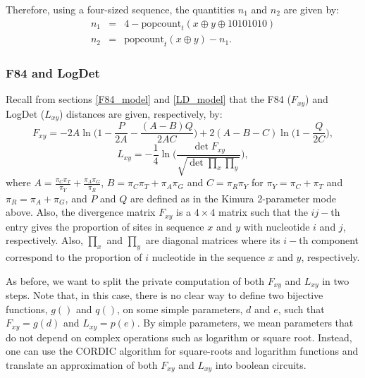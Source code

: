 Therefore, using a four-sized sequence, the quantities $n_1$ and $n_2$ are given by:
\begin{eqnarray*}
n_1 &=& 4 - \text{popcount}_t(x\oplus y\oplus 10101010)\\
n_2 &=& \text{popcount}_t(x\oplus y) - n_1.
\end{eqnarray*}





\subsubsection{F84 and LogDet}
Recall from sections \ref{F84_model} and \ref{LD_model} that the F84 ($F_{xy} $) and LogDet ($L_{xy} $) distances are given, respectively, by:
\begin{equation}
    F_{xy} = -2 A\ln\bigg( 1- \frac{P}{2A} - \frac{(A-B)Q}{2AC} \bigg) + 2(A-B-C)\ln\bigg( 1-\frac{Q}{2C} \bigg),
\label{eq:F84_distance}
\end{equation}
\begin{equation}
    L_{xy} = -\frac{1}{4}\ln\Bigg( \frac{\det F_{xy}}{\sqrt{\det \prod_x \prod_y}} \Bigg),
\label{eq:LogDet_distance}
\end{equation}
where $A = \frac{\pi_C \pi_T}{\pi_Y} + \frac{\pi_A \pi_G}{\pi_R}$, $B=\pi_C\pi_T + \pi_A\pi_G$ and $C=\pi_R\pi_Y$ for $\pi_Y = \pi_C + \pi_T$ and $\pi_R = \pi_A + \pi_G$, and $P$ and $Q$ are defined as in the Kimura 2-parameter mode above. Also, the divergence matrix $F_{xy}$ is a $4\times 4$ matrix such that the $ij-$th entry gives the proportion of sites in sequence $x$ and $y$ with nucleotide $i$ and $j$, respectively. Also, $\prod_x$ and $\prod_y$ are diagonal matrices where its $i-$th component correspond to the proportion of $i$ nucleotide in the sequence $x$ and $y$, respectively.

As before, we want to split the private computation of both $F_{xy}$ and $L_{xy}$ in two steps. Note that, in this case, there is no clear way to define two bijective functions, $g()$ and $q()$, on some simple parameters, $d$ and $e$, such that $F_{xy} = g(d)$ and $L_{xy} = p(e)$. By simple parameters, we mean parameters that do not depend on complex operations such as logarithm or square root. Instead, one can use the CORDIC algorithm \cite{V59, Songhori2019} for square-roots and logarithm functions and translate an approximation of both $F_{xy}$ and $L_{xy}$ into boolean circuits.



